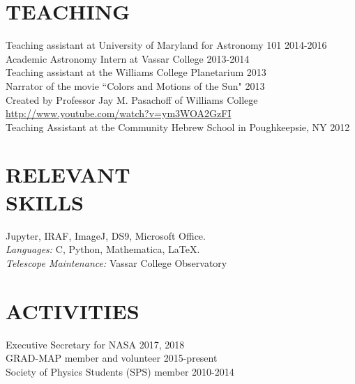 \documentclass[line,margin]{res}
\begin{document}
\begin{resume}
\section{TEACHING} 
Teaching assistant at University of Maryland for Astronomy 101 \hfill 2014-2016\\
Academic Astronomy Intern at Vassar College \hfill 2013-2014 \\
Teaching assistant at the Williams College Planetarium \hfill 2013
				\\
Narrator of the movie ``Colors and Motions of the Sun" \hfill 2013\\
\setlength{\parindent}{.88cm}
				\indent Created by Professor Jay M. Pasachoff of Williams College \\	
				\indent	\url{http://www.youtube.com/watch?v=ym3WOA2GzFI}
				\\
Teaching Assistant at the Community Hebrew School in Poughkeepsie, NY \hfill  2012

\section{RELEVANT \\ SKILLS} 
 Jupyter, IRAF, ImageJ, DS9, Microsoft Office. \\
                {\sl Languages:} C, Python, Mathematica, LaTeX. \\
                {\sl Telescope Maintenance:} Vassar College Observatory\\

\section{ACTIVITIES}
\noindent Executive Secretary for NASA \hfill 2017, 2018 \\
\noindent GRAD-MAP member and volunteer \hfill 2015-present  \\
Society of Physics Students (SPS) member \hfill 2010-2014
                
\end{resume}
\end{document}
